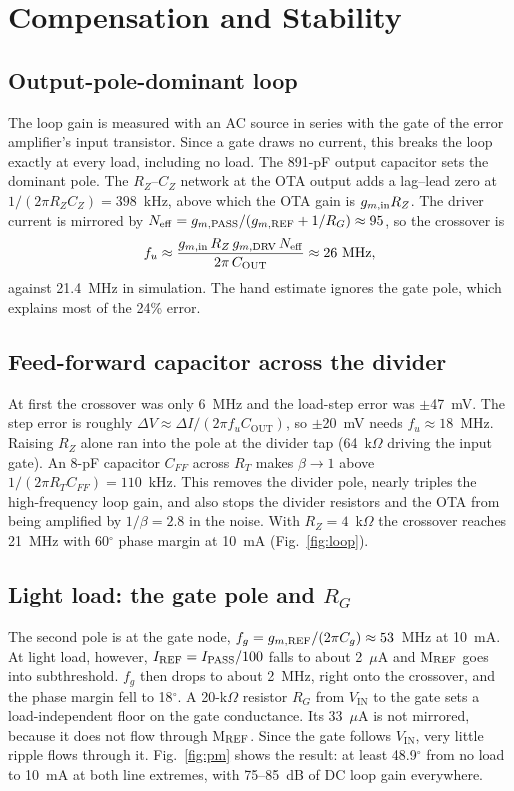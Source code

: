 \documentclass[conference]{IEEEtran}
\newcommand{\Vin}{V_{\mathrm{IN}}}\newcommand{\Vout}{V_{\mathrm{OUT}}}
\newcommand{\Cout}{C_{\mathrm{OUT}}}\newcommand{\Cgd}{C_{gd}}
\begin{document}
\section{Compensation and Stability}
\subsection{Output-pole-dominant loop}
The loop gain is measured with an AC source in series with the gate of the error amplifier's input transistor. Since a gate draws no current, this breaks the loop exactly at every load, including no load. The 891-pF output capacitor sets the dominant pole. The $R_Z$--$C_Z$ network at the OTA output adds a lag--lead zero at $1/(2\pi R_ZC_Z)=398$~kHz, above which the OTA gain is $g_{m,\rm in}R_Z$. The driver current is mirrored by $N_{\rm eff}=g_{m,\rm PASS}/(g_{m,\rm REF}+1/R_G)\approx 95$, so the crossover is
\begin{equation}
f_u \approx \frac{g_{m,\rm in}\,R_Z\,g_{m,\rm DRV}\,N_{\rm eff}}{2\pi\,\Cout} \approx 26~{\rm MHz},
\end{equation}
against 21.4~MHz in simulation. The hand estimate ignores the gate pole, which explains most of the 24\% error.

\subsection{Feed-forward capacitor across the divider}
At first the crossover was only 6~MHz and the load-step error was $\pm$47~mV. The step error is roughly $\Delta V\approx\Delta I/(2\pi f_u\Cout)$, so $\pm$20~mV needs $f_u\approx 18$~MHz. Raising $R_Z$ alone ran into the pole at the divider tap (64~k$\Omega$ driving the input gate). An 8-pF capacitor $C_{FF}$ across $R_T$ makes $\beta\to1$ above $1/(2\pi R_TC_{FF})=110$~kHz. This removes the divider pole, nearly triples the high-frequency loop gain, and also stops the divider resistors and the OTA from being amplified by $1/\beta=2.8$ in the noise. With $R_Z=4$~k$\Omega$ the crossover reaches 21~MHz with 60$^\circ$ phase margin at 10~mA (Fig.~\ref{fig:loop}).

\subsection{Light load: the gate pole and $R_G$}
The second pole is at the gate node, $f_g=g_{m,\rm REF}/(2\pi C_g)\approx 53$~MHz at 10~mA. At light load, however, $I_{\rm REF}=I_{\rm PASS}/100$ falls to about 2~$\mu$A and M$_{\rm REF}$ goes into subthreshold. $f_g$ then drops to about 2~MHz, right onto the crossover, and the phase margin fell to 18$^\circ$. A 20-k$\Omega$ resistor $R_G$ from $\Vin$ to the gate sets a load-independent floor on the gate conductance. Its 33~$\mu$A is not mirrored, because it does not flow through M$_{\rm REF}$. Since the gate follows $\Vin$, very little ripple flows through it. Fig.~\ref{fig:pm} shows the result: at least 48.9$^\circ$ from no load to 10~mA at both line extremes, with 75--85~dB of DC loop gain everywhere.
\end{document}
